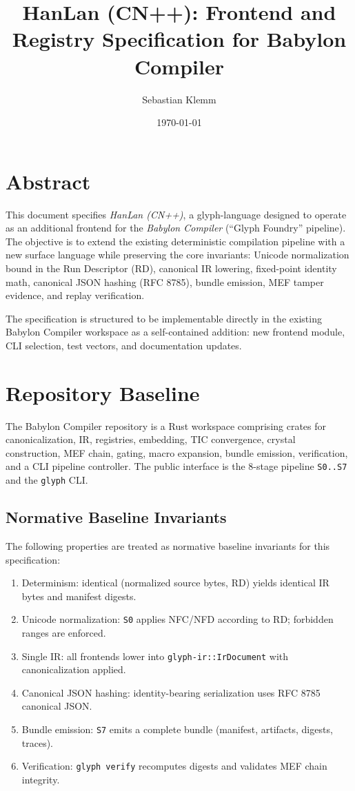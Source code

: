 \documentclass[12pt]{article}
\title{HanLan (CN++): Frontend and Registry Specification for Babylon Compiler}
\author{Sebastian Klemm}
\date{\today}
\begin{document}
\maketitle
\tableofcontents

\section{Abstract}
This document specifies \emph{HanLan (CN++)}, a glyph-language designed to operate as an additional
frontend for the \emph{Babylon Compiler} (``Glyph Foundry'' pipeline). The objective is to extend the
existing deterministic compilation pipeline with a new surface language while preserving the
core invariants: Unicode normalization bound in the Run Descriptor (RD), canonical IR lowering,
fixed-point identity math, canonical JSON hashing (RFC 8785), bundle emission, MEF tamper evidence,
and replay verification.

The specification is structured to be implementable directly in the existing Babylon Compiler
workspace as a self-contained addition: new frontend module, CLI selection, test vectors, and
documentation updates.

\section{Repository Baseline}
The Babylon Compiler repository is a Rust workspace comprising crates for canonicalization, IR,
registries, embedding, TIC convergence, crystal construction, MEF chain, gating, macro expansion,
bundle emission, verification, and a CLI pipeline controller. The public interface is the 8-stage
pipeline \texttt{S0..S7} and the \texttt{glyph} CLI.

\subsection{Normative Baseline Invariants}
The following properties are treated as normative baseline invariants for this specification:
\begin{enumerate}[leftmargin=1.5em]
  \item Determinism: identical (normalized source bytes, RD) yields identical IR bytes and manifest digests.
  \item Unicode normalization: \texttt{S0} applies NFC/NFD according to RD; forbidden ranges are enforced.
  \item Single IR: all frontends lower into \texttt{glyph-ir::IrDocument} with canonicalization applied.
  \item Canonical JSON hashing: identity-bearing serialization uses RFC 8785 canonical JSON.
  \item Bundle emission: \texttt{S7} emits a complete bundle (manifest, artifacts, digests, traces).
  \item Verification: \texttt{glyph verify} recomputes digests and validates MEF chain integrity.
\end{enumerate}
\end{document}
